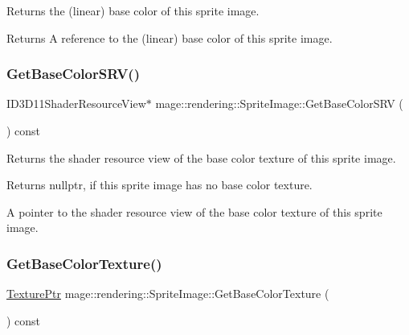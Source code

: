 Returns the (linear) base color of this sprite image.

\begin{DoxyReturn}{Returns}
A reference to the (linear) base color of this sprite image. 
\end{DoxyReturn}
\hypertarget{classmage_1_1rendering_1_1_sprite_image_a7dceee8dfe1432948a77f0563d6b70a3}{}\label{classmage_1_1rendering_1_1_sprite_image_a7dceee8dfe1432948a77f0563d6b70a3} 
\subsubsection{\texorpdfstring{Get\+Base\+Color\+S\+R\+V()}{GetBaseColorSRV()}}
{\footnotesize\ttfamily I\+D3\+D11\+Shader\+Resource\+View$\ast$ mage\+::rendering\+::\+Sprite\+Image\+::\+Get\+Base\+Color\+S\+RV (\begin{DoxyParamCaption}{ }\end{DoxyParamCaption}) const\hspace{0.3cm}{\ttfamily [noexcept]}}

Returns the shader resource view of the base color texture of this sprite image.

\begin{DoxyReturn}{Returns}
{\ttfamily nullptr}, if this sprite image has no base color texture. 

A pointer to the shader resource view of the base color texture of this sprite image. 
\end{DoxyReturn}
\hypertarget{classmage_1_1rendering_1_1_sprite_image_ab5b257c4df82dc72223affe8b32c0b70}{}\label{classmage_1_1rendering_1_1_sprite_image_ab5b257c4df82dc72223affe8b32c0b70} 
\subsubsection{\texorpdfstring{Get\+Base\+Color\+Texture()}{GetBaseColorTexture()}}
{\footnotesize\ttfamily \hyperlink{namespacemage_1_1rendering_a6f3ae54f825328465b0cdde0f0de4a36}{Texture\+Ptr} mage\+::rendering\+::\+Sprite\+Image\+::\+Get\+Base\+Color\+Texture (\begin{DoxyParamCaption}{ }\end{DoxyParamCaption}) const\hspace{0.3cm}{\ttfamily [noexcept]}}

